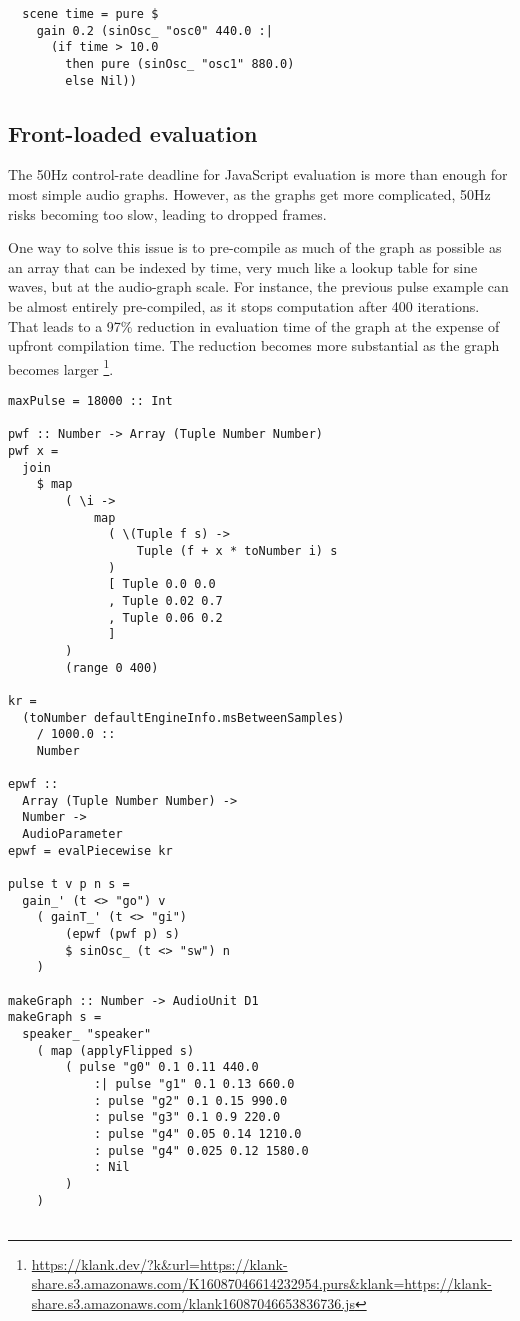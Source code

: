 \documentclass{sig-alternate}
\begin{document}
\begin{sloppypar}
  \begin{verbatim}
  scene time = pure $
    gain 0.2 (sinOsc_ "osc0" 440.0 :|
      (if time > 10.0
        then pure (sinOsc_ "osc1" 880.0)
        else Nil))
  \end{verbatim}

  \subsection{Front-loaded evaluation}

  The 50Hz control-rate deadline for JavaScript evaluation is more than enough for most simple audio graphs. However, as the graphs get more complicated, 50Hz risks becoming too slow, leading to dropped frames.

  One way to solve this issue is to pre-compile as much of the graph as possible as an array that can be indexed by time, very much like a lookup table for sine waves, but at the audio-graph scale. For instance, the previous pulse example can be almost entirely pre-compiled, as it stops computation after 400 iterations.  That leads to a 97\% reduction in evaluation time of the graph at the expense of upfront compilation time.  The reduction becomes more substantial as the graph becomes larger \footnote{\url{https://klank.dev/?k&url=https://klank-share.s3.amazonaws.com/K16087046614232954.purs&klank=https://klank-share.s3.amazonaws.com/klank16087046653836736.js}}.

  \begin{verbatim}
maxPulse = 18000 :: Int

pwf :: Number -> Array (Tuple Number Number)
pwf x =
  join
    $ map
        ( \i ->
            map
              ( \(Tuple f s) ->
                  Tuple (f + x * toNumber i) s
              )
              [ Tuple 0.0 0.0
              , Tuple 0.02 0.7
              , Tuple 0.06 0.2
              ]
        )
        (range 0 400)

kr =
  (toNumber defaultEngineInfo.msBetweenSamples)
    / 1000.0 ::
    Number

epwf ::
  Array (Tuple Number Number) ->
  Number ->
  AudioParameter
epwf = evalPiecewise kr

pulse t v p n s =
  gain_' (t <> "go") v
    ( gainT_' (t <> "gi")
        (epwf (pwf p) s)
        $ sinOsc_ (t <> "sw") n
    )

makeGraph :: Number -> AudioUnit D1
makeGraph s =
  speaker_ "speaker"
    ( map (applyFlipped s)
        ( pulse "g0" 0.1 0.11 440.0
            :| pulse "g1" 0.1 0.13 660.0
            : pulse "g2" 0.1 0.15 990.0
            : pulse "g3" 0.1 0.9 220.0
            : pulse "g4" 0.05 0.14 1210.0
            : pulse "g4" 0.025 0.12 1580.0
            : Nil
        )
    )


\end{verbatim}
\end{sloppypar}
\end{document}
